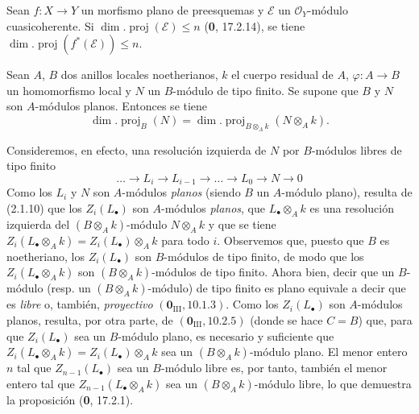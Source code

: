 \begin{corollary}[6.2.2]
\label{IV.2.s6.2.2-fr}
Sean $f:X\to Y$ un morfismo plano de preesquemas y $\mathscr E$ un
$\mathcal O_Y$-módulo cuasicoherente. Si
$\dim.\operatorname{proj}(\mathscr E)\leq n$ \textup{(\textbf{0}, 17.2.14)}, se tiene
$\dim.\operatorname{proj}(f^*(\mathscr E))\leq n$.
\end{corollary}


\begin{proposition}[6.2.3]
Sean $A$, $B$ dos anillos locales noetherianos, $k$ el cuerpo residual de
$A$, $\varphi:A\to B$ un homomorfismo local y $N$ un $B$-módulo de tipo finito.
Se supone que $B$ y $N$ son $A$-módulos planos. Entonces se tiene
\begin{equation}
\dim.\operatorname{proj}_B(N)
=\dim.\operatorname{proj}_{B\otimes_Ak}(N\otimes_Ak).
\tag{6.2.3.1}\label{IV.2.s6.2.3.1-fr}
\end{equation}
\end{proposition}

Consideremos, en efecto, una resolución izquierda de $N$ por $B$-módulos
libres de tipo finito
\[
\ldots\to L_i\to L_{i-1}\to\ldots\to L_0\to N\to0
\]
Como los $L_i$ y $N$ son $A$-módulos \emph{planos} (siendo $B$ un $A$-módulo
plano), resulta de (2.1.10) que los $Z_i(L_\bullet)$ son $A$-módulos
\emph{planos}, que $L_\bullet\otimes_Ak$ es una resolución izquierda del
$(B\otimes_Ak)$-módulo $N\otimes_Ak$ y que se tiene
$Z_i(L_\bullet\otimes_Ak)=Z_i(L_\bullet)\otimes_Ak$ para todo $i$. Observemos
que, puesto que $B$ es noetheriano, los $Z_i(L_\bullet)$ son $B$-módulos de
tipo finito, de modo que los $Z_i(L_\bullet\otimes_Ak)$ son
$(B\otimes_Ak)$-módulos de tipo finito. Ahora bien, decir que un $B$-módulo
(resp. un $(B\otimes_Ak)$-módulo) de tipo finito es plano equivale a decir que
es \emph{libre} o, también, \emph{proyectivo} $(\mathbf{0}_{\mathrm{III}}, 10.1.3)$. Como los
$Z_i(L_\bullet)$ son $A$-módulos planos, resulta, por otra parte, de
$(\mathbf{0}_{\mathrm{III}}, 10.2.5)$ (donde se hace $C=B$) que, para que
$Z_i(L_\bullet)$ sea un $B$-módulo plano, es necesario y suficiente que
$Z_i(L_\bullet\otimes_Ak)=Z_i(L_\bullet)\otimes_Ak$ sea un $(B\otimes_Ak)$-módulo plano. El menor
entero $n$ tal que $Z_{n-1}(L_\bullet)$ sea un $B$-módulo libre es, por tanto,
también el menor entero tal que $Z_{n-1}(L_\bullet\otimes_Ak)$ sea un
$(B\otimes_Ak)$-módulo libre, lo que demuestra la proposición (\textbf 0, 17.2.1).
